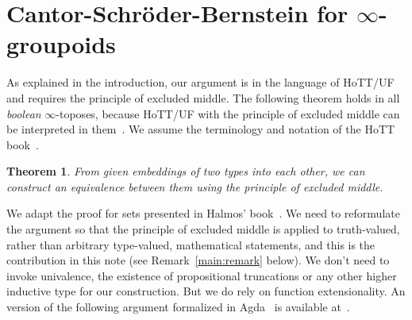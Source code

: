 \documentclass{article}
\newtheorem{theorem}{Theorem}[section]
\theoremstyle{definition}
\begin{document}
\section{Cantor-Schr\"oder-Bernstein for $\infty$-groupoids}

As explained in the introduction, our argument is in the language of
HoTT/UF and requires the principle of excluded middle. The following
theorem holds in all \emph{boolean} $\infty$-toposes, because HoTT/UF
with the principle of excluded middle can be interpreted in
them~\cite{shulman:infty}. We assume the terminology and notation of
the HoTT book~\cite{hottbook}.

\begin{theorem}
  From given embeddings of two types into each other, we can construct
  an equivalence between them using the principle of excluded middle.
\end{theorem}

We adapt the proof for sets presented in Halmos'
book~\cite{MR0453532}. We need to reformulate the argument so that the
principle of excluded middle is applied to truth-valued, rather than
arbitrary type-valued, mathematical statements, and this is the
contribution in this note (see Remark~\ref{main:remark} below).  We
don't need to invoke univalence, the existence of propositional
truncations or any other higher inductive type for our
construction. But we do rely on function extensionality. An version of
the following argument formalized in Agda~\cite{agda} is available
at~\cite{2019arXiv191100580H,escardo:csb}.
\end{document}
